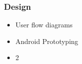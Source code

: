 
\frametitle{Design}
\begin{itemize}
	\item User flow diagrams
	\item Android Prototyping
	\item 2
\end{itemize}
